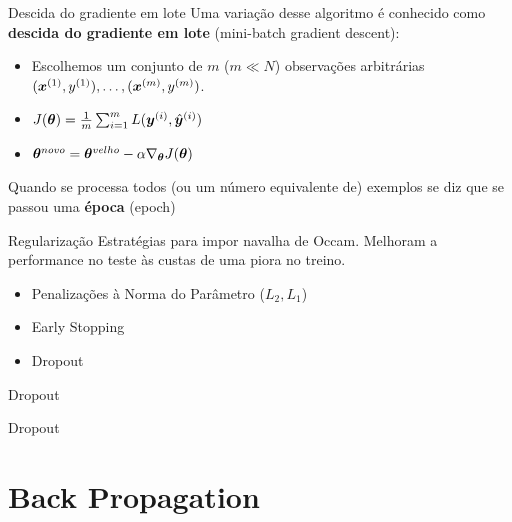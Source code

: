 \documentclass[10pt]{beamer}
\begin{document}
\begin{frame}[fragile]{Descida do gradiente em lote}
Uma variação desse algoritmo é conhecido como \textbf{descida do gradiente em lote} (\alert{mini-batch gradient descent}):

\begin{itemize}
\item Escolhemos um conjunto de $m$ ($m \ll N$) observações arbitrárias $(\bm{x}^{(1)},y^{(1)}), \dots, (\bm{x}^{(m)},y^{(m)})$.
\vspace{0.3cm}
\item $J(\bm{\theta}) =  \frac{1}{m}\sum_{i=1}^{m} L(\bm{y}^{(i)}, {\hat{\bm{y}}}^{(i)})$
\vspace{0.3cm}
\item $\bm{\theta}^{novo} = \bm{\theta}^{velho} - \alpha \nabla_{\bm{\theta}} {J(\bm{\theta})}$
\end{itemize}
Quando se processa todos (ou um número equivalente de) exemplos se diz que se passou uma \textbf{época} (\alert{epoch})
\end{frame}

\begin{frame}[fragile]{Regularização}
Estratégias para impor navalha de Occam. Melhoram a performance no teste às custas de uma piora no treino.
\vspace{0.3cm}
\begin{itemize}
	\item Penalizações à Norma do Parâmetro ($L_2, L_1$)\\
    \vspace{0.3cm}
    \item Early Stopping
    \vspace{0.3cm}
    \item Dropout
    
\end{itemize}
\end{frame}

\begin{frame}[fragile]{Dropout}

\end{frame}

\begin{frame}[fragile]{Dropout}

\end{frame}

\section{Back Propagation}
\end{document}
